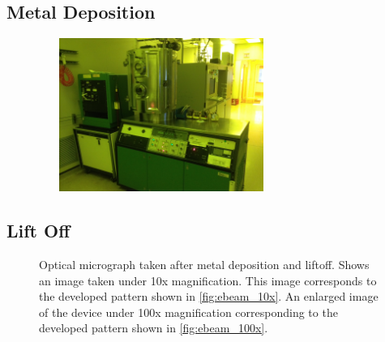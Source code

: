 \subsection{Metal Deposition}\label{subsec:metal_deposition}

\begin{figure}[ht]
    \centering
    \includegraphics[height=5cm,width=8cm]{enerjet}
    \caption[Metal deposition system]{}
    \label{fig:enerjet}
\end{figure}

\subsection{Lift Off}\label{subsec:lift_off}

\begin{figure}[ht]
    \centering 
    \qquad
    \caption[Example of electrodes after liftoff]{
        Optical micrograph taken after metal deposition and liftoff. 
        \protect{} Shows an image taken under 10x magnification. This image corresponds to the developed pattern shown in \ref{fig:ebeam_10x}.
        \protect{} An enlarged image of the device under 100x magnification corresponding to the developed pattern shown in \ref{fig:ebeam_100x}.
    }
\end{figure}

